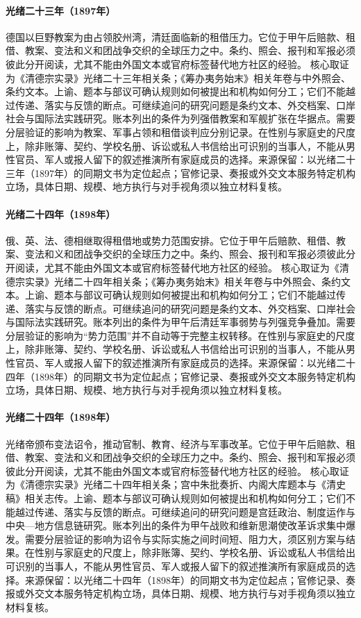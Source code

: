 \hypertarget{public:EQ-1897-JIAOZHOU-BAY-OCCUPATION}{}\paragraph{光绪二十三年（1897年）}德国以巨野教案为由占领胶州湾，清廷面临新的租借压力。它位于甲午后赔款、租借、教案、变法和义和团战争交织的全球压力之中。条约、照会、报刊和军报必须彼此分开阅读，尤其不能由外国文本或官府标签替代地方社区的经验。 核心取证为《清德宗实录》光绪二十三年相关条；《筹办夷务始末》相关年卷与中外照会、条约文本。上谕、题本与部议可确认规则如何被提出和机构如何分工；它们不能越过传递、落实与反馈的断点。可继续追问的研究问题是条约文本、外交档案、口岸社会与国际法实践研究。账本列出的条件为列强借教案和军舰扩张在华据点。需要分层验证的影响为教案、军事占领和租借谈判应分别记录。在性别与家庭史的尺度上，除非账簿、契约、学校名册、诉讼或私人书信给出可识别的当事人，不能从男性官员、军人或报人留下的叙述推演所有家庭成员的选择。来源保留：以光绪二十三年（1897年）的同期文书为定位起点；官修记录、奏报或外交文本服务特定机构立场，具体日期、规模、地方执行与对手视角须以独立材料复核。
\hypertarget{public:EQ-1898-LEASED-TERRITORIES}{}\paragraph{光绪二十四年（1898年）}俄、英、法、德相继取得租借地或势力范围安排。它位于甲午后赔款、租借、教案、变法和义和团战争交织的全球压力之中。条约、照会、报刊和军报必须彼此分开阅读，尤其不能由外国文本或官府标签替代地方社区的经验。 核心取证为《清德宗实录》光绪二十四年相关条；《筹办夷务始末》相关年卷与中外照会、条约文本。上谕、题本与部议可确认规则如何被提出和机构如何分工；它们不能越过传递、落实与反馈的断点。可继续追问的研究问题是条约文本、外交档案、口岸社会与国际法实践研究。账本列出的条件为甲午后清廷军事弱势与列强竞争叠加。需要分层验证的影响为“势力范围”并不自动等于完整主权转移。在性别与家庭史的尺度上，除非账簿、契约、学校名册、诉讼或私人书信给出可识别的当事人，不能从男性官员、军人或报人留下的叙述推演所有家庭成员的选择。来源保留：以光绪二十四年（1898年）的同期文书为定位起点；官修记录、奏报或外交文本服务特定机构立场，具体日期、规模、地方执行与对手视角须以独立材料复核。
\hypertarget{public:EQ-1898-HUNDRED-DAYS-REFORM}{}\paragraph{光绪二十四年（1898年）}光绪帝颁布变法诏令，推动官制、教育、经济与军事改革。它位于甲午后赔款、租借、教案、变法和义和团战争交织的全球压力之中。条约、照会、报刊和军报必须彼此分开阅读，尤其不能由外国文本或官府标签替代地方社区的经验。 核心取证为《清德宗实录》光绪二十四年相关条；宫中朱批奏折、内阁大库题本与《清史稿》相关志传。上谕、题本与部议可确认规则如何被提出和机构如何分工；它们不能越过传递、落实与反馈的断点。可继续追问的研究问题是宫廷政治、制度运作与中央—地方信息链研究。账本列出的条件为甲午战败和维新思潮使改革诉求集中爆发。需要分层验证的影响为诏令与实际实施之间时间短、阻力大，须区别方案与结果。在性别与家庭史的尺度上，除非账簿、契约、学校名册、诉讼或私人书信给出可识别的当事人，不能从男性官员、军人或报人留下的叙述推演所有家庭成员的选择。来源保留：以光绪二十四年（1898年）的同期文书为定位起点；官修记录、奏报或外交文本服务特定机构立场，具体日期、规模、地方执行与对手视角须以独立材料复核。
